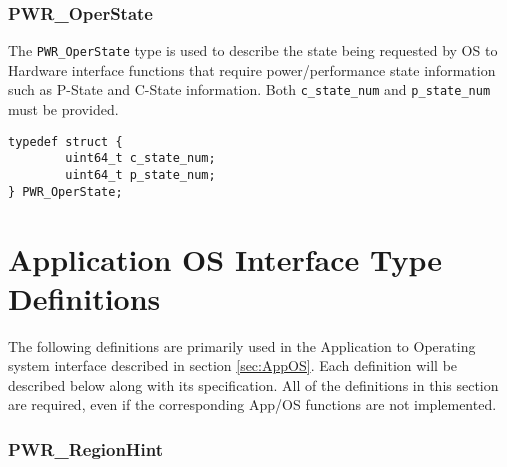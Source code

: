 \documentclass[12pt]{report} %
\begin{document}

\subsubsection{PWR_OperState}\label{type:OperState}

The \texttt{PWR_OperState} type is used to describe the state being requested by OS to Hardware interface functions that require power/performance state information such as P-State and C-State information. 
Both \texttt{c_state_num} and \texttt{p_state_num} must be provided.

\begin{center}
\begin{minipage}{.95\linewidth}%
\begin{lstlisting}
typedef struct {
        uint64_t c_state_num;
        uint64_t p_state_num;
} PWR_OperState;
\end{lstlisting}
\end{minipage}
\end{center}




\section{Application OS Interface Type Definitions}\label{sec:AppOSTypeDefinitions}
The following definitions are primarily used in the Application to Operating system interface described in section \ref{sec:AppOS}.
Each definition will be described below along with its specification. All of the definitions in this section are required, even if the corresponding App/OS functions are not implemented.

\subsubsection{PWR_RegionHint}\label{type:RegionHint}
\end{document}
